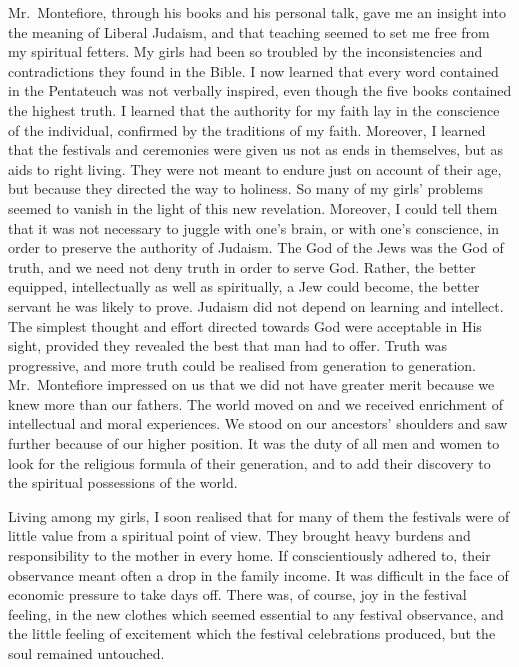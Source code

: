 Mr.\ Montefiore, through his books and his personal
talk, gave me an insight into the meaning of Liberal
Judaism, and that teaching seemed to set me free from
my spiritual fetters. My girls had been so troubled by
the inconsistencies and contradictions they found in
the Bible. I now learned that every word contained in
the Pentateuch was not verbally inspired, even though
the five books contained the highest truth. I learned
that the authority for my faith lay in the conscience of
the individual, confirmed by the traditions of my faith.
Moreover, I learned that the festivals and ceremonies
were given us not as ends in themselves, but as aids to
right living. They were not meant to endure just on
account of their age, but because they directed the way
to holiness. So many of my girls’ problems seemed to
vanish in the light of this new revelation. Moreover,
I could tell them that it was not necessary to juggle with
one’s brain, or with one’s conscience, in order to preserve
the authority of Judaism. The God of the Jews was the God
of truth, and we need not deny truth in order to serve
God. Rather, the better equipped, intellectually as well
as spiritually, a Jew could become, the better servant he
was likely to prove. Judaism did not depend on learning
and intellect. The simplest thought and effort directed
towards God were acceptable in His sight, provided they
revealed the best that man had to offer. Truth was
progressive, and more truth could be realised from
generation to generation. Mr.\ Montefiore impressed on us
that we did not have greater merit because we knew more
than our fathers. The world moved on and we received
enrichment of intellectual and moral experiences. We
stood on our ancestors’ shoulders and saw further because
of our higher position. It was the duty of all men and
women to look for the religious formula of their generation,
and to add their discovery to the spiritual possessions
of the world.

Living among my girls, I soon realised that for many
of them the festivals were of little value from a spiritual
point of view. They brought heavy burdens and responsibility
to the mother in every home. If conscientiously
adhered to, their observance meant often a drop in the
family income. It was difficult in the face of economic
pressure to take days off. There was, of course, joy in
the festival feeling, in the new clothes which seemed
essential to any festival observance, and the little
feeling of excitement which the festival celebrations
produced, but the soul remained untouched.

